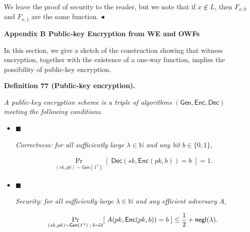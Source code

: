 We leave the proof of security to the reader, but we note that if $x\notin L$, then $F_{x,0}$ and $F_{x,1}$ are the same function.
$\blacktriangleleft$\par






\par\medskip\noindent\textbf{
Appendix B Public-key Encryption from WE and OWFs}\par




In this section, we give a sketch of the construction showing that witness encryption, together with the existence of a one-way function, implies the possibility of public-key encryption.\par





\par\medskip\noindent\textbf{
\textbf{Definition 77}\textbf{ }(Public-key encryption)\textbf{.}
}\par



\emph{A public-key encryption scheme is a triple of algorithms $({\mathsf{Gen}},{\mathsf{Enc}},{\mathsf{Dec}})$ meeting the following conditions.}\par


\begin{itemize}


\item[] 
$\blacksquare$ 


\emph{Correctness:}\emph{ for all sufficiently large }$\lambda\in\mathbb{N}$\emph{ and any bit }$b\in\{0,1\}$\emph{,}\par


\[\begin{gathered}
\Pr_{(sk,pk)\sim{\mathsf{Gen}}(1^{\lambda})}[\;{\mathsf{Dec}}(sk,{\mathsf{Enc}}(pk,b))=b\;]=1.
\end{gathered}\]





\item[] 
$\blacksquare$ 


\emph{Security:}\emph{ for all sufficiently large }$\lambda\in\mathbb{N}$\emph{ and any efficient adversary }$A$\emph{,}\par


\[\begin{gathered}
\Pr_{(sk,pk)\sim{\mathsf{Gen}}(1^{\lambda})\;;\;b\sim\mathcal{U}}[\;A(pk,{\mathsf{Enc}}(pk,b))=b\;]\leq\frac{1}{2}+{\sf negl}(\lambda).
\end{gathered}\]





\end{itemize}



